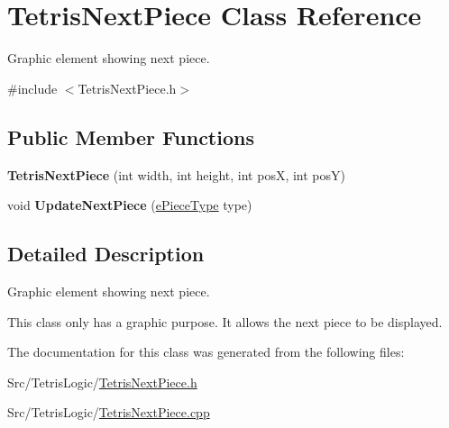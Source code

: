 \hypertarget{classTetrisNextPiece}{\section{Tetris\-Next\-Piece Class Reference}
\label{classTetrisNextPiece}
}


Graphic element showing next piece.  




{\ttfamily \#include $<$Tetris\-Next\-Piece.\-h$>$}

\subsection*{Public Member Functions}
\begin{DoxyCompactItemize}
\item 
\hypertarget{classTetrisNextPiece_a6a59914fc2291fef74596d70782cd687}{{\bfseries Tetris\-Next\-Piece} (int width, int height, int pos\-X, int pos\-Y)}\label{classTetrisNextPiece_a6a59914fc2291fef74596d70782cd687}

\item 
\hypertarget{classTetrisNextPiece_a9423411eab7f16daf6dd9dfd12a76b0d}{void {\bfseries Update\-Next\-Piece} (\hyperlink{TetrisGfxBlock_8h_a2592cbf66d668df0e31fa8d0d8a174de}{e\-Piece\-Type} type)}\label{classTetrisNextPiece_a9423411eab7f16daf6dd9dfd12a76b0d}

\end{DoxyCompactItemize}


\subsection{Detailed Description}
Graphic element showing next piece. 

This class only has a graphic purpose. It allows the next piece to be displayed. 

The documentation for this class was generated from the following files\-:\begin{DoxyCompactItemize}
\item 
Src/\-Tetris\-Logic/\hyperlink{TetrisNextPiece_8h}{Tetris\-Next\-Piece.\-h}\item 
Src/\-Tetris\-Logic/\hyperlink{TetrisNextPiece_8cpp}{Tetris\-Next\-Piece.\-cpp}\end{DoxyCompactItemize}
